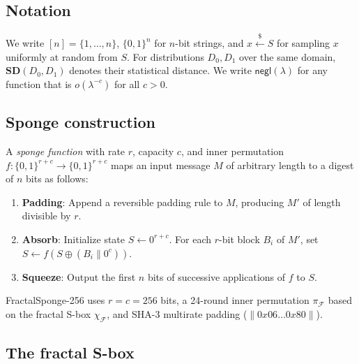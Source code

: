 \documentclass[11pt]{article}
\theoremstyle{definition}
\theoremstyle{remark}
\newcommand{\sbox}{\chi_{\mathcal{F}}} %
\newcommand{\bits}{\{0,1\}}
\newcommand{\negl}{\mathsf{negl}}
\newcommand{\SD}{\mathbf{SD}}         %
\newcommand{\perm}{\pi_{\mathcal{F}}} %
\begin{document}
\subsection{Notation}

We write $[n] = \{1, \ldots, n\}$, $\bits^n$ for $n$-bit strings, and
$x \xleftarrow{\$} S$ for sampling $x$ uniformly at random from $S$.
For distributions $D_0, D_1$ over the same domain, $\SD(D_0, D_1)$ denotes
their statistical distance. We write $\negl(\lambda)$ for any function that
is $o(\lambda^{-c})$ for all $c > 0$.

\subsection{Sponge construction}

A \emph{sponge function} \cite{Bertoni2007} with rate $r$, capacity $c$, and
inner permutation $f : \bits^{r+c} \to \bits^{r+c}$ maps an input message $M$
of arbitrary length to a digest of $n$ bits as follows:

\begin{enumerate}
    \item \textbf{Padding}: Append a reversible padding rule to $M$, producing
          $M'$ of length divisible by $r$.
    \item \textbf{Absorb}: Initialize state $S \leftarrow 0^{r+c}$. For each
          $r$-bit block $B_i$ of $M'$, set $S \leftarrow f(S \oplus (B_i \| 0^c))$.
    \item \textbf{Squeeze}: Output the first $n$ bits of successive applications
          of $f$ to $S$.
\end{enumerate}

FractalSponge-256 uses $r = c = 256$ bits, a 24-round inner permutation $\perm$
based on the fractal S-box $\sbox$, and SHA-3 multirate padding ($\|0x06\ldots0x80\|$).

\subsection{The fractal S-box}
\end{document}

